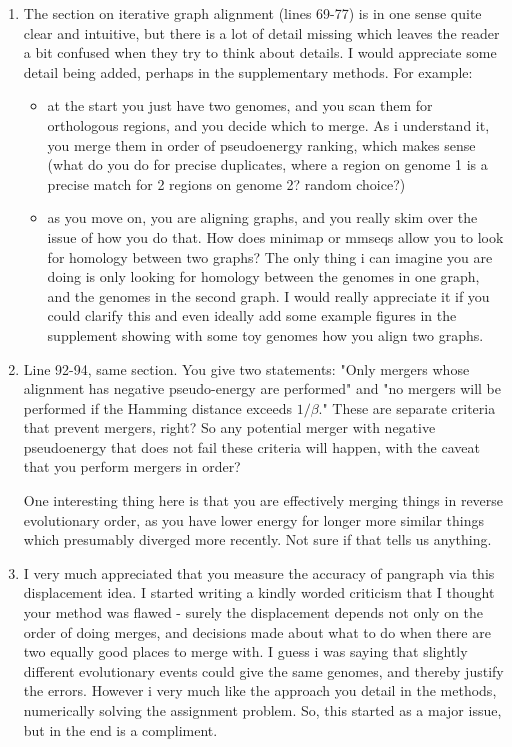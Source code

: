 \documentclass{article}
\begin{document}
\begin{enumerate}
    \item The section on iterative graph alignment (lines 69-77) is in one sense quite clear and intuitive, but there is a lot of detail missing which leaves the reader a bit confused when they try to think about details. I would appreciate some detail being added, perhaps in the supplementary methods. For example:
          \begin{itemize}
              \item at the start you just have two genomes, and you scan them for orthologous regions, and you decide which to merge. As i understand it, you merge them in order of pseudoenergy ranking, which makes sense (what do you do for precise duplicates, where a region on genome 1 is a precise match for 2 regions on genome 2? random choice?)
              \item as you move on, you are aligning graphs, and you really skim over the issue of how you do that. How does minimap or mmseqs allow you to look for homology between two graphs? The only thing i can imagine you are doing is only looking for homology between the genomes in one graph, and the genomes in the second graph. I would really appreciate it if you could clarify this and even ideally add some example figures in the supplement showing with some toy genomes how you align two graphs.
          \end{itemize}

    \item Line 92-94, same section. You give two statements:
          "Only mergers whose alignment has negative pseudo-energy are performed"
          and
          "no mergers will be performed if the Hamming distance exceeds $1/\beta$."
          These are separate criteria that prevent mergers, right? So any potential merger with negative pseudoenergy that does not fail these criteria will happen, with the caveat that you perform mergers in order?

          One interesting thing here is that you are effectively merging things in reverse evolutionary order, as you have lower energy for longer more similar things which presumably diverged more recently. Not sure if that tells us anything.

    \item I very much appreciated that you measure the accuracy of pangraph via this displacement idea. I started writing a kindly worded criticism that I thought your method was flawed - surely the displacement depends not only on the order of doing merges, and decisions made about what to do when there are two equally good places to merge with. I guess i was saying that slightly different evolutionary events could give the same genomes, and thereby justify the errors. However i very much like the approach you detail in the methods, numerically solving the assignment problem. So, this started as a major issue, but in the end is a compliment.


\end{enumerate}
\end{document}
